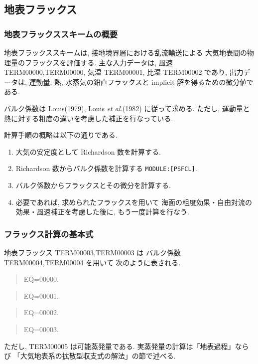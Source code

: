 ﻿
\subsection{地表フラックス}

\subsubsection{地表フラックススキームの概要}

地表フラックススキームは, 
接地境界層における乱流輸送による
大気地表間の物理量のフラックスを評価する.
主な入力データは, 風速 TERM00000,TERM00000, 気温 TERM00001, 比湿 TERM00002 であり,
出力データは, 運動量, 熱, 水蒸気の鉛直フラックスと
implicit 解を得るための微分値である.

バルク係数は Louis(1979), Louis {\em et al.}(1982) に従って求める. 
ただし, 運動量と熱に対する粗度の違いを考慮した補正を行なっている. 

計算手順の概略は以下の通りである.
\begin{enumerate}
\item 大気の安定度として
      Richardson 数を計算する.
\item Richardson 数からバルク係数を計算する \texttt{MODULE:[PSFCL]}.
\item バルク係数からフラックスとその微分を計算する.
\item 必要であれば, 求められたフラックスを用いて
      海面の粗度効果・自由対流の効果・風速補正を考慮した後に,
      もう一度計算を行なう.
\end{enumerate}

\subsubsection{フラックス計算の基本式}

地表フラックス TERM00003,TERM00003 は
バルク係数 TERM00004,TERM00004 を用いて
次のように表される.
%
\begin{quote}
EQ=00000.
\end{quote}
\begin{quote}
EQ=00001.
\end{quote}
\begin{quote}
EQ=00002.
\end{quote}
\begin{quote}
EQ=00003.
\end{quote}
%
ただし, TERM00005 は可能蒸発量である.
実蒸発量の計算は「地表過程」ならび
「大気地表系の拡散型収支式の解法」の節で述べる.

